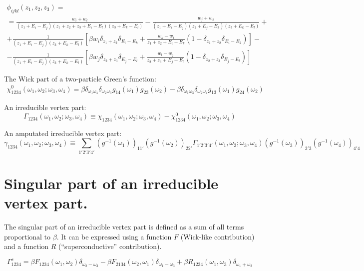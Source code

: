 \documentclass{article}
\begin{document}
\begin{multline*}
    \phi_{ijkl}(z_1,z_2,z_3) = \\ =
        \frac{w_i + w_l}{(z_1+E_i-E_j)(z_1+z_2+z_3+E_i-E_l)(z_3+E_k-E_l)} -
        \frac{w_j + w_k}{(z_1+E_i-E_j)(z_2+E_j-E_k)(z_3+E_k-E_l)} + \\ +
        \frac{1}{(z_1+E_i-E_j)(z_3+E_k-E_l)}
            \left[\beta w_i\delta_{z_1+z_2}\delta_{E_i-E_k} + 
            \frac{w_k-w_i}{z_1+z_2+E_i-E_k}(1-\delta_{z_1+z_2}\delta_{E_i-E_k})\right] -\\-
        \frac{1}{(z_1+E_i-E_j)(z_3+E_k-E_l)}
            \left[\beta w_j\delta_{z_2+z_3}\delta_{E_j-E_l} + 
            \frac{w_l-w_j}{z_2+z_3+E_j-E_l}(1-\delta_{z_2+z_3}\delta_{E_j-E_l})\right]
\end{multline*}

The Wick part of a two-particle Green's function:
\begin{eqnarray*}
    \chi^0_{1234}(\omega_1,\omega_2;\omega_3,\omega_4) = 
        \beta\delta_{\omega_1\omega_4}\delta_{\omega_2\omega_3}g_{14}(\omega_1)g_{23}(\omega_2) -
        \beta\delta_{\omega_1\omega_3}\delta_{\omega_2\omega_4}g_{13}(\omega_1)g_{24}(\omega_2)
\end{eqnarray*}

An irreducible vertex part:
\[
    \Gamma_{1234}(\omega_1,\omega_2;\omega_3,\omega_4) \equiv 
        \chi_{1234}(\omega_1,\omega_2;\omega_3,\omega_4) -
        \chi^{0}_{1234}(\omega_1,\omega_2;\omega_3,\omega_4)
\]

An amputated irreducible vertex part:
\[
    \gamma_{1234}(\omega_1,\omega_2;\omega_3,\omega_4) \equiv 
        \sum_{1'2'3'4'}
        (g^{-1}(\omega_1))_{11'} (g^{-1}(\omega_2))_{22'}
        \Gamma_{1'2'3'4'}(\omega_1,\omega_2;\omega_3,\omega_4)
        (g^{-1}(\omega_3))_{3'3} (g^{-1}(\omega_4))_{4'4}
\]

\section{Singular part of an irreducible vertex part.}

The singular part of an irreducible vertex part is defined as a sum of all terms proportional to $\beta$.
It can be expressed using a function $F$ (Wick-like contribution) and a function $R$ (``superconductive'' contribution).

\begin{equation*}
    \Gamma^{s}_{1234} = 
          \beta F_{1234}(\omega_1,\omega_2) \delta_{\omega_2-\omega_3} 
        - \beta F_{2134}(\omega_2,\omega_1) \delta_{\omega_1-\omega_3}
        + \beta R_{1234}(\omega_1,\omega_3) \delta_{\omega_1+\omega_2}
\end{equation*}
\end{document}

